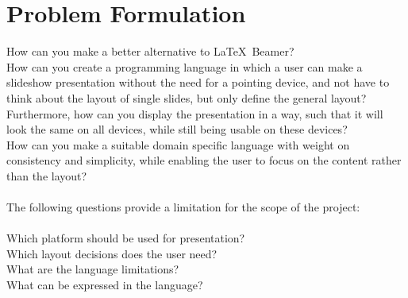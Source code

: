 \chapter{Problem Formulation}
\label{ProblemFormulation}
How can you make a better alternative to \LaTeX~Beamer? \\
How can you create a programming language in which a user can make a slideshow presentation without the need for a pointing device, and not have to think about the layout of single slides, but only define the general layout? \\
Furthermore, how can you display the presentation in a way, such that it will look the same on all devices, while still being usable on these devices? \\
How can you make a suitable domain specific language with weight on consistency and simplicity, while enabling the user to focus on the content rather than the layout?
\\ \\
The following questions provide a limitation for the scope of the project:
\\ \\
Which platform should be used for presentation? \\
Which layout decisions does the user need? \\
What are the language limitations? \\
What can be expressed in the language?